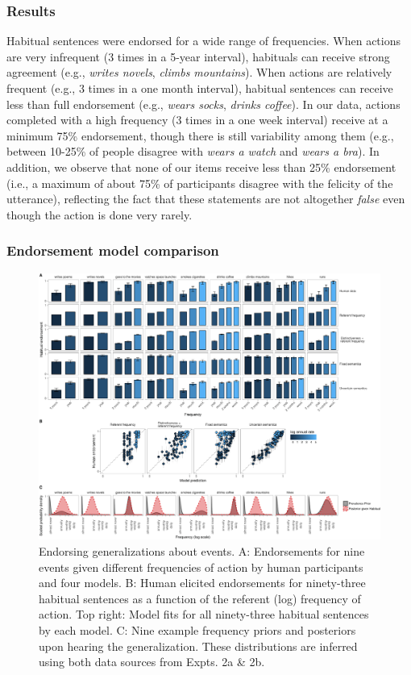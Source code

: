\documentclass[english,floatsintext,man]{apa6}
\theoremstyle{definition}
\theoremstyle{definition}
\theoremstyle{definition}
\theoremstyle{remark}
\begin{document}
\subsubsection{Results}\label{results-2}

Habitual sentences were endorsed for a wide range of frequencies. When
actions are very infrequent (3 times in a 5-year interval), habituals
can receive strong agreement (e.g., \emph{writes novels},
\emph{climbs mountains}). When actions are relatively frequent (e.g., 3
times in a one month interval), habitual sentences can receive less than
full endorsement (e.g., \emph{wears socks}, \emph{drinks coffee}). In
our data, actions completed with a high frequency (3 times in a one week
interval) receive at a minimum 75\% endorsement, though there is still
variability among them (e.g., between 10-25\% of people disagree with
\emph{wears a watch} and \emph{wears a bra}). In addition, we observe
that none of our items receive less than 25\% endorsement (i.e., a
maximum of about 75\% of participants disagree with the felicity of the
utterance), reflecting the fact that these statements are not altogether
\emph{false} even though the action is done very rarely.

\subsubsection{Endorsement model
comparison}\label{endorsement-model-comparison-1}

\begin{figure}[htbp]
\centering
\includegraphics{figs/habituals-endorsement-figure-1.pdf}
\caption{\label{fig:habituals-endorsement-figure}Endorsing generalizations
about events. A: Endorsements for nine events given different
frequencies of action by human participants and four models. B: Human
elicited endorsements for ninety-three habitual sentences as a function
of the referent (log) frequency of action. Top right: Model fits for all
ninety-three habitual sentences by each model. C: Nine example frequency
priors and posteriors upon hearing the generalization. These
distributions are inferred using both data sources from Expts. 2a \&
2b.}
\end{figure}
\end{document}
